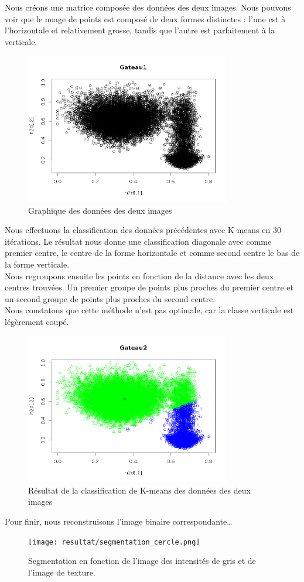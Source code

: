 \documentclass[a4paper,11pt]{article}
\begin{document}
  Nous créons une matrice composée des données des deux images. Nous pouvons voir que le nuage
  de points est composé de deux formes distinctes : l'une est à l'horizontale et relativement grosse, tandis 
  que l'autre est parfaitement à la verticale.
  
  \begin{figure}[H]
    \center
    \includegraphics[width=9cm]{resultat/image_combine.png}
    \caption{Graphique des données des deux images}
  \end{figure}
  
  Nous effectuons la classification des données précédentes avec K-means en 30 itérations. Le résultat
  nous donne une classification diagonale avec comme premier centre, le centre de la forme horizontale et 
  comme second centre le bas de la forme verticale.\\
  
  Nous regroupons ensuite les points en fonction de la distance avec les deux centres trouvées. 
  Un premier groupe de points plus proches du premier centre et un second groupe de points plus 
  proches du second centre.\\
  
  Nous constatons que cette méthode n'est pas optimale, car la classe verticale est légèrement coupé.\\
  
  \begin{figure}[H]
    \center
    \includegraphics[width=9cm]{resultat/classification_gateau.png}
    \caption{Résultat de la classification de K-means des données des deux images}
  \end{figure}
  
  Pour finir, nous reconstruisons l'image binaire correspondante\ldots
  
  \begin{figure}[H]
    \center
    \texttt{[image: resultat/segmentation\_cercle.png]}
    \caption{Segmentation en fonction de l'image des intensités de gris et de l'image de texture.}
  \end{figure}
  
\end{document}

